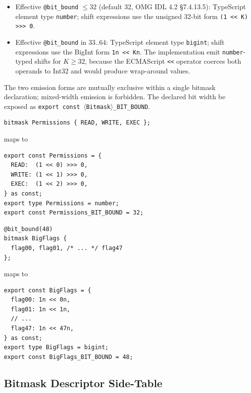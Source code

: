 \documentclass{../styles/zerodds-vendor-spec}
\begin{document}
\begin{itemize}[noitemsep]
  \item Effective \texttt{@bit\_bound} $\leq 32$ (default 32, OMG
        IDL 4.2 §7.4.13.5): TypeScript element type
        \texttt{number}; shift expressions  use the
        unsigned 32-bit form
        \texttt{(1 \texttt{<<} K) \texttt{>>>} 0}.
  \item Effective \texttt{@bit\_bound} in $33..64$: TypeScript
        element type \texttt{bigint}; shift expressions
         use the BigInt form \texttt{1n \texttt{<<} Kn}.
        The implementation  emit
        \texttt{number}-typed shifts for $K \geq 32$, because the
        ECMAScript \texttt{<<} operator coerces both operands to
        Int32 and would produce wrap-around values.
\end{itemize}

The two emission forms are mutually exclusive within a single
bitmask declaration; mixed-width emission is forbidden. The
declared bit width  be exposed as
\texttt{export const $\langle$Bitmask$\rangle$\_BIT\_BOUND}.

\begin{specexample}
\begin{lstlisting}
bitmask Permissions { READ, WRITE, EXEC };
\end{lstlisting}
maps to
\begin{lstlisting}
export const Permissions = {
  READ:  (1 << 0) >>> 0,
  WRITE: (1 << 1) >>> 0,
  EXEC:  (1 << 2) >>> 0,
} as const;
export type Permissions = number;
export const Permissions_BIT_BOUND = 32;
\end{lstlisting}
\end{specexample}

\begin{specexample}
\begin{lstlisting}
@bit_bound(48)
bitmask BigFlags {
  flag00, flag01, /* ... */ flag47
};
\end{lstlisting}
maps to
\begin{lstlisting}
export const BigFlags = {
  flag00: 1n << 0n,
  flag01: 1n << 1n,
  // ...
  flag47: 1n << 47n,
} as const;
export type BigFlags = bigint;
export const BigFlags_BIT_BOUND = 48;
\end{lstlisting}
\end{specexample}

\subsection{Bitmask Descriptor Side-Table}\label{sec:bitmask-descriptor}
\end{document}
